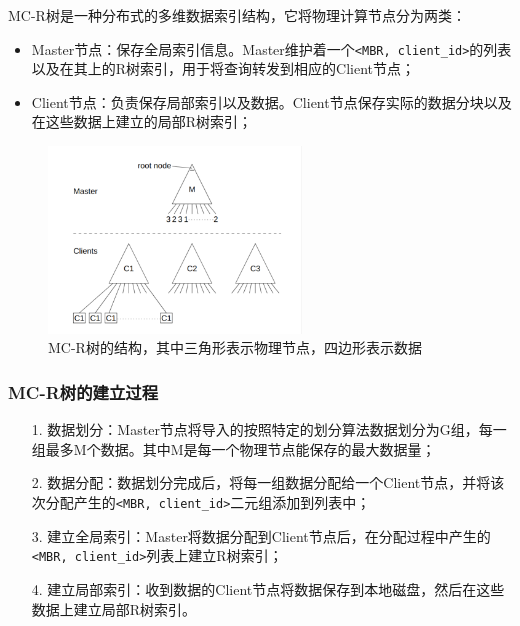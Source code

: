 \documentclass{elegantpaper}
\begin{document}
MC-R树是一种分布式的多维数据索引结构，它将物理计算节点分为两类：

\begin{itemize}

    \item Master节点：保存全局索引信息。Master维护着一个\verb|<MBR, client_id>|的列表以及在其上的R树索引，用于将查询转发到相应的Client节点；
    
    \item Client节点：负责保存局部索引以及数据。Client节点保存实际的数据分块以及在这些数据上建立的局部R树索引；
    
\end{itemize}

\begin{figure}[!ht]
    \centering
    \includegraphics[width=0.6\textwidth]{figure/MC-Rtree.png}
    \caption{MC-R树的结构，其中三角形表示物理节点，四边形表示数据}
\end{figure}

\subsubsection{MC-R树的建立过程}

\begin{itemize}
    
    \item[1.] 数据划分：Master节点将导入的按照特定的划分算法数据划分为G组，每一组最多M个数据。其中M是每一个物理节点能保存的最大数据量；
    
    \item[2.] 数据分配：数据划分完成后，将每一组数据分配给一个Client节点，并将该次分配产生的\verb|<MBR, client_id>|二元组添加到列表中；
  
    \item[3.] 建立全局索引：Master将数据分配到Client节点后，在分配过程中产生的\verb|<MBR, client_id>|列表上建立R树索引；
    
    \item[4.] 建立局部索引：收到数据的Client节点将数据保存到本地磁盘，然后在这些数据上建立局部R树索引。
 
\end{itemize}
\end{document}
